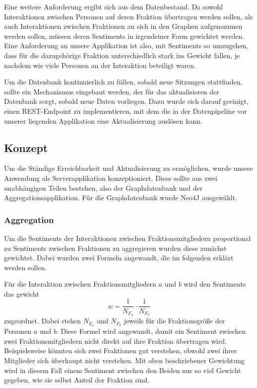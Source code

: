 Eine weitere Anforderung ergibt sich aus dem Datenbestand. Da sowohl Interaktionen zwischen Personen auf deren Fraktion übertragen werden sollen, als auch Interaktionen zwischen Fraktionen an sich in den Graphen aufgenommen werden sollen, müssen deren Sentiments in irgendeiner Form gewichtet werden. Eine Anforderung an unsere Applikation ist also, mit Sentiments so umzugehen, dass für die dazugehörige Fraktion unterschiedlich stark ins Gewicht fallen, je nachdem wie viele Personen an der Interaktion beteiligt waren.

Um die Datenbank kontinuierlich zu füllen, sobald neue Sitzungen stattfinden, sollte ein Mechanismus eingebaut werden, der für das aktualisieren der Datenbank sorgt, sobald neue Daten vorliegen. Dazu wurde sich darauf geeinigt, einen REST-Endpoint zu implementieren, mit dem die in der Datenpipeline vor unserer liegenden Applikation eine Aktualisierung auslösen kann.

\subsection{Konzept}
Um die Ständige Erreichbarkeit und Aktualisierung zu ermöglichen, wurde unsere Anwendung als Serverapplikation konzeptioniert. Diese sollte aus zwei unabhängigen Teilen bestehen, also der Graphdatenbank und der Aggregationsapplikation. Für die Graphdatenbank wurde Neo4J ausgewählt.

\subsubsection{Aggregation}
Um die Sentiments der Interaktionen zwischen Fraktionsmitgliedern proportional zu Sentiments zwischen Fraktionen zu aggregieren wurden diese zunächst gewichtet. Dabei wurden zwei Formeln angewandt, die im folgenden erklärt werden sollen.

Für die Interaktion zwischen Fraktionsmitgliedern $a$ und $b$ wird den Sentiments das gewicht 
$$w=\frac{1}{N_{F_a}} \cdot \frac{1}{N_{F_b}}$$
zugeordnet. Dabei stehen $N_{F_a}$ und $N_{F_b}$ jeweils für die Fraktionsgröße der Personen $a$ und $b$. Diese Formel wird angewandt, damit ein Sentiment zwischen zwei Fraktionsmitgliedern nicht direkt auf ihre Fraktion übertragen wird. Beispielsweise könnten sich zwei Fraktionen gut verstehen, obwohl zwei ihrer Mitglieder sich überhaupt nicht verstehen. Mit oben beschriebener Gewichtung wird in diesem Fall einem Sentiment zwischen den Beiden nur so viel Gewicht gegeben, wie sie selbst Anteil der Fraktion sind.

